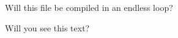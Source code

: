 \documentclass[12pt,a4paper]{article}
\begin{document}
Will this file be compiled in an endless loop?

    
Will you see this text?
\end{document}
